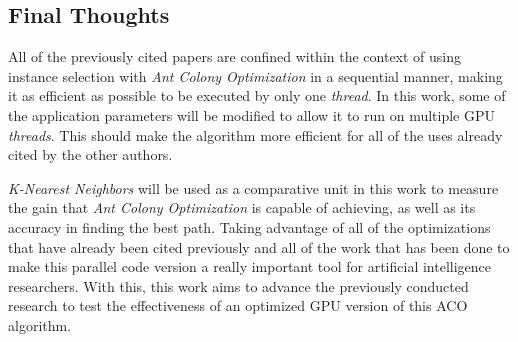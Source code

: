 \subsection{Final Thoughts}

All of the previously cited papers are confined within the context of using instance selection with \emph{Ant Colony Optimization} in a sequential manner, making it as efficient as possible to be executed by only one \emph{thread}. In this work, some of the application parameters will be modified to allow it to run on multiple GPU \emph{threads}. This should make the algorithm more efficient for all of the uses already cited by the other authors.

\emph{K-Nearest Neighbors} will be used as a comparative unit in this work to measure the gain that \emph{Ant Colony Optimization} is capable of achieving, as well as its accuracy in finding the best path. Taking advantage of all of the optimizations that have already been cited previously and all of the work that has been done to make this parallel code version a really important tool for artificial intelligence researchers. With this, this work aims to advance the previously conducted research to test the effectiveness of an optimized GPU version of this ACO algorithm.

